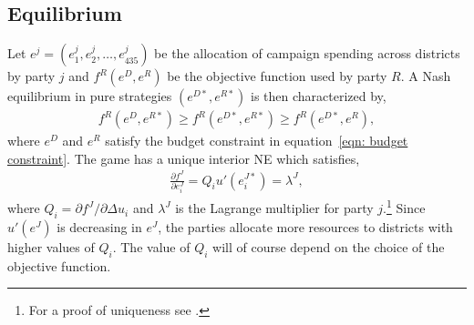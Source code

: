 \documentclass[12pt,final,fleqn]{article}
\theoremstyle{plain}
\begin{document}
\subsection{Equilibrium} \label{sec: equilibrium}
Let $e^j = (e_1^j, e_2^j, \ldots, e_{435}^j)$ be the allocation of campaign spending across districts by party $j$ and $f^R(e^D, e^R)$ be the objective function used by party $R$. A Nash equilibrium in pure strategies $(e^{D*}, e^{R*})$ is then characterized by,
\begin{align}
f^R(e^D, e^{R*}) \geq f^R(e^{D*}, e^{R*}) \geq f^R(e^{D*}, e^{R}),
\end{align}
where $e^D$ and $e^R$ satisfy the budget constraint in equation~\ref{eqn: budget constraint}. The game has a unique interior NE which satisfies,
\begin{align}
\frac{\partial f^J}{\partial e_i^J}= Q_i u'(e^{J*}_i)=\lambda^J,
\end{align}
where $Q_i = \partial f^J/ \partial \Delta u_i$ and $\lambda^J$ is the Lagrange multiplier for party $j$.\footnote{For a proof of uniqueness see \citet{stromberg2008electoral}.} Since $u'(e^J)$ is decreasing in $e^J$, the parties allocate more resources to districts with higher values of $Q_i$. The value of $Q_i$ will of course depend on the choice of the objective function.
\end{document}
